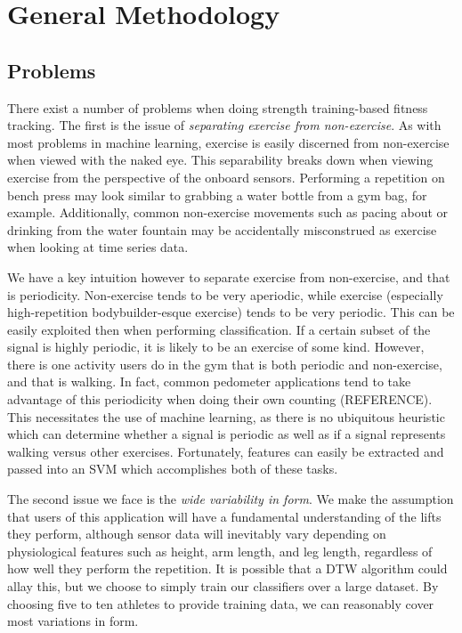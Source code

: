 \chapter{General Methodology}

\section{Problems}

There exist a number of problems when doing strength training-based fitness tracking. The first is the issue of \textit{separating exercise from non-exercise}. As with most problems in machine learning, exercise is easily discerned from non-exercise when viewed with the naked eye. This separability breaks down when viewing exercise from the perspective of the onboard sensors. Performing a repetition on bench press may look similar to grabbing a water bottle from a gym bag, for example. Additionally, common non-exercise movements such as pacing about or drinking from the water fountain may be accidentally misconstrued as exercise when looking at time series data. 

We have a key intuition however to separate exercise from non-exercise, and that is periodicity. Non-exercise tends to be very aperiodic, while exercise (especially high-repetition bodybuilder-esque exercise) tends to be very periodic. This can be easily exploited then when performing classification. If a certain subset of the signal is highly periodic, it is likely to be an exercise of some kind. However, there is one activity users do in the gym that is both periodic and non-exercise, and that is walking. In fact, common pedometer applications tend to take advantage of this periodicity when doing their own counting (REFERENCE). This necessitates the use of machine learning, as there is no ubiquitous heuristic which can determine whether a signal is periodic as well as if a signal represents walking versus other exercises. Fortunately, features can easily be extracted and passed into an SVM which accomplishes both of these tasks.

The second issue we face is the \textit{wide variability in form}. We make the assumption that users of this application will have a fundamental understanding of the lifts they perform, although sensor data will inevitably vary depending on physiological features such as height, arm length, and leg length, regardless of how well they perform the repetition. It is possible that a DTW algorithm could allay this, but we choose to simply train our classifiers over a large dataset. By choosing five to ten athletes to provide training data, we can reasonably cover most variations in form. 


